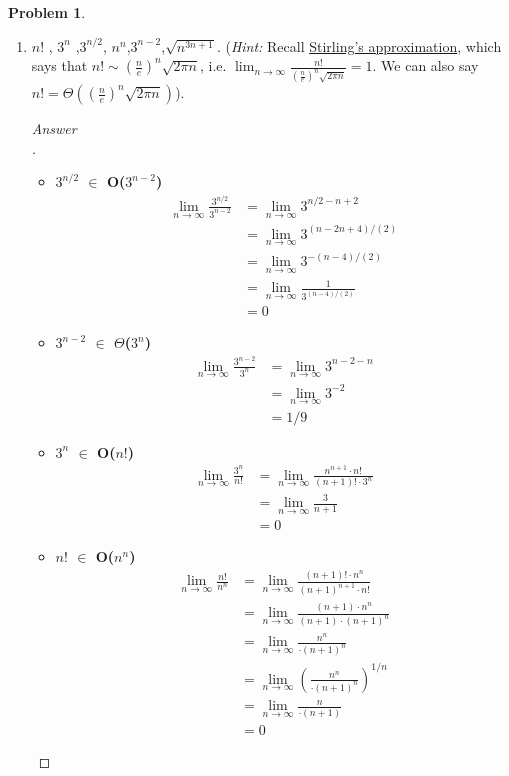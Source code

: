 \documentclass[11pt]{article}
\theoremstyle{definition}
\theoremstyle{definition}
\newtheorem{required}{Problem}
\theoremstyle{definition}
\begin{document}
\begin{required}
\begin{enumerate}[label=(\alph*)]
\subsection{Problem 3\ref{2b}}
        \item \label{2b} $n!$ , \qquad $3^n$ ,\qquad  $3^{n/2}$, \qquad  $n^n$,\qquad $3^{n-2}$,\qquad  $\sqrt{n^{3n+1}}$. (\emph{Hint:} Recall \href{https://en.wikipedia.org/wiki/Stirling\%27s_approximation}{Stirling's approximation}, which says that $n! \sim \left(\frac{n}{e}\right)^n \sqrt{2 \pi n}$, i.e. $\lim_{n \to \infty} \frac{n!}{\left(\frac{n}{e}\right)^n \sqrt{2 \pi n}} = 1$. We can also say $n! = \Theta (\left(\frac{n}{e}\right)^n \sqrt{2 \pi n} )$).
\begin{proof}[Answer\\]
\begin{itemize}
\item \textbf{ $3^{n/2}$ $\in$ O($3^{n-2}$)}
\begin{align*}
\lim_{n \to \infty} \frac {3^{n/2}}{3^{n-2}} &= \lim_{n \to \infty} 3^{n/2-n+2}\\
&= \lim_{n \to \infty}  3^{(n-2n+4)/(2)}\\
&= \lim_{n \to \infty}  3^{-(n-4) /(2)}\\
&= \lim_{n \to \infty}  \frac {1}{3^{(n-4) /(2)}}\\
&= 0
\end{align*}

\item \textbf{ $3^{n-2}$ $\in$ $\Theta$($3^n$)}
\begin{align*}
\lim_{n \to \infty} \frac {3^{n-2}}{3^{n}} &= \lim_{n \to \infty} 3^{n-2-n}\\
&= \lim_{n \to \infty}  3^{-2}\\
&= 1/9
\end{align*}

\item \textbf{ $3^n$ $\in$ O($n!$)}
\begin{align*}
\lim_{n \to \infty} \frac {3^{n}}{n!} &= \lim_{n \to \infty} \frac {n^{n+1}\cdot n!}{(n+1)! \cdot 3^n}\\
&= \lim_{n \to \infty}  \frac {3}{n+1}\\
&= 0
\end{align*}

\item \textbf{ $n!$ $\in$ O($n^n$)}
\begin{align*}
\lim_{n \to \infty} \frac {n!}{n^n} &= \lim_{n \to \infty} \frac {(n+1)! \cdot n^n}{(n+1)^{n+1} \cdot n!}\\
&= \lim_{n \to \infty}  \frac {(n+1) \cdot n^n}{(n+1) \cdot (n+1)^n}\\
&= \lim_{n \to \infty}  \frac { n^n}{\cdot (n+1)^n}\\
&= \lim_{n \to \infty}  (\frac { n^n}{\cdot (n+1)^n})^{1/n}\\
&= \lim_{n \to \infty}  \frac { n}{\cdot (n+1)}\\
&= 0
\end{align*}


\end{itemize}
\end{proof}
\end{enumerate}
\end{required}
\end{document}
